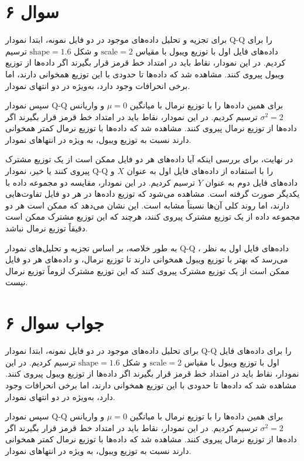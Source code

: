 \section*{سوال ۶}

برای تجزیه و تحلیل داده‌های موجود در دو فایل نمونه، ابتدا نمودار Q-Q را برای داده‌های فایل اول با توزیع ویبول با مقیاس \( \text{scale} = 2 \) و شکل \( \text{shape} = 1.6 \) ترسیم کردیم. در این نمودار، نقاط باید در امتداد خط قرمز قرار بگیرند اگر داده‌ها از توزیع ویبول پیروی کنند. مشاهده شد که داده‌ها تا حدودی با این توزیع همخوانی دارند، اما برخی انحرافات وجود دارد، به‌ویژه در دو انتهای نمودار.

سپس نمودار Q-Q برای همین داده‌ها را با توزیع نرمال با میانگین \( \mu = 0 \) و واریانس \( \sigma^2 = 2 \) ترسیم کردیم. در این نمودار، نقاط باید در امتداد خط قرمز قرار بگیرند اگر داده‌ها از توزیع نرمال پیروی کنند. مشاهده شد که داده‌ها با توزیع نرمال کمتر همخوانی دارند نسبت به توزیع ویبول، به ویژه در انتهاهای نمودار.

در نهایت، برای بررسی اینکه آیا داده‌های هر دو فایل ممکن است از یک توزیع مشترک پیروی کنند یا خیر، نمودار Q-Q را با استفاده از داده‌های فایل اول به عنوان \( X \) و داده‌های فایل دوم به عنوان \( Y \) ترسیم کردیم. در این نمودار، مقایسه دو مجموعه داده با یکدیگر صورت گرفته است. مشاهده می‌شود که توزیع داده‌ها در هر دو فایل تفاوت‌هایی دارند، اما روند کلی آن‌ها نسبتاً مشابه است. این نشان می‌دهد که ممکن است هر دو مجموعه داده از یک توزیع مشترک پیروی کنند، هرچند که این توزیع مشترک ممکن است دقیقاً توزیع نرمال نباشد.

به طور خلاصه، بر اساس تجزیه و تحلیل‌های نمودار Q-Q ، داده‌های فایل اول به نظر می‌رسد که بهتر با توزیع ویبول همخوانی دارند تا توزیع نرمال، و داده‌های هر دو فایل ممکن است از یک توزیع مشترک پیروی کنند که این توزیع مشترک لزوماً توزیع نرمال نیست.

\section*{جواب سوال ۶}

برای تحلیل داده‌های موجود در دو فایل نمونه، ابتدا نمودار Q-Q را برای داده‌های فایل اول با توزیع ویبول با مقیاس \( \text{scale} = 2 \) و شکل \( \text{shape} = 1.6 \) ترسیم کردیم. در این نمودار، نقاط باید در امتداد خط قرمز قرار بگیرند اگر داده‌ها از توزیع ویبول پیروی کنند. مشاهده شد که داده‌ها تا حدودی با این توزیع همخوانی دارند، اما برخی انحرافات وجود دارد، به‌ویژه در دو انتهای نمودار.

سپس نمودار Q-Q برای همین داده‌ها را با توزیع نرمال با میانگین \( \mu = 0 \) و واریانس \( \sigma^2 = 2 \) ترسیم کردیم. در این نمودار، نقاط باید در امتداد خط قرمز قرار بگیرند اگر داده‌ها از توزیع نرمال پیروی کنند. مشاهده شد که داده‌ها با توزیع نرمال کمتر همخوانی دارند نسبت به توزیع ویبول، به ویژه در انتهاهای نمودار.

